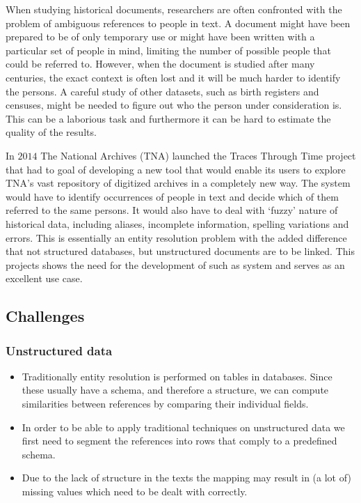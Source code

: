 \documentclass[paper=a4, fontsize=11pt]{scrartcl}
\begin{document}
When studying historical documents, researchers are often confronted with the problem of ambiguous references to people in text. A document might have been prepared to be of only temporary use or might have been written with a particular set of people in mind, limiting the number of possible people that could be referred to. However, when the document is studied after many centuries, the exact context is often lost and it will be much harder to identify the persons. A careful study of other datasets, such as birth registers and censuses, might be needed to figure out who the person under consideration is. This can be a laborious task and furthermore it can be hard to estimate the quality of the results.

In $2014$ The National Archives (TNA) launched the Traces Through Time project that had to goal of developing a new tool that would enable its users to explore TNA's vast repository of digitized archives in a completely new way. The system would have to identify occurrences of people in text and decide which of them referred to the same persons. It would also have to deal with `fuzzy' nature of historical data, including aliases, incomplete information, spelling variations and errors. This is essentially an entity resolution problem with the added difference that not structured databases, but unstructured documents are to be linked. This projects shows the need for the development of such as system and serves as an excellent use case.

\subsection{Challenges}
\subsubsection{Unstructured data}
\begin{itemize}
	\item Traditionally entity resolution is performed on tables in databases. Since these usually have a schema, and therefore a structure, we can compute similarities between references by comparing their individual fields.
	\item In order to be able to apply traditional techniques on unstructured data we first need to segment the references into rows that comply to a predefined schema.
	\item Due to the lack of structure in the texts the mapping may result in (a lot of) missing values which need to be dealt with correctly.
\end{itemize}
\end{document}
